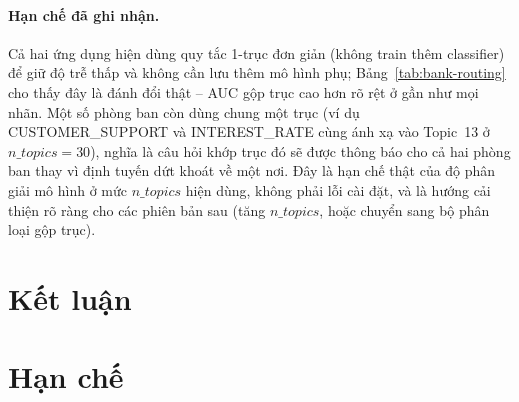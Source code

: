 \documentclass[11pt]{article}
\begin{document}
\paragraph{Hạn chế đã ghi nhận.} Cả hai ứng dụng hiện dùng quy tắc 1-trục
đơn giản (không train thêm classifier) để giữ độ trễ thấp và không cần lưu
thêm mô hình phụ; Bảng~\ref{tab:bank-routing} cho thấy đây là đánh đổi thật
-- AUC gộp trục cao hơn rõ rệt ở gần như mọi nhãn. Một số phòng ban còn
dùng chung một trục (ví dụ CUSTOMER\_SUPPORT và INTEREST\_RATE cùng ánh xạ
vào Topic~13 ở $n\_topics=30$), nghĩa là câu hỏi khớp trục đó sẽ được
thông báo cho cả hai phòng ban thay vì định tuyến dứt khoát về một nơi.
Đây là hạn chế thật của độ phân giải mô hình ở mức $n\_topics$ hiện dùng,
không phải lỗi cài đặt, và là hướng cải thiện rõ ràng cho các phiên bản
sau (tăng $n\_topics$, hoặc chuyển sang bộ phân loại gộp trục).

\section{Kết luận}
\label{sec:conclusion}

\section*{Hạn chế}


\end{document}
